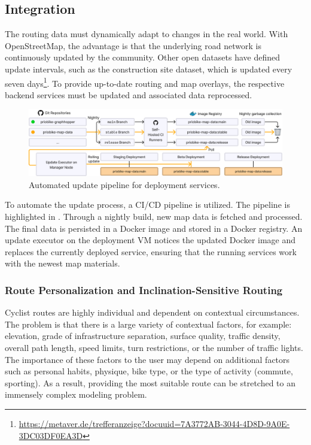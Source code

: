 \subsection{Integration}

The routing data must dynamically adapt to changes in the real world. With OpenStreetMap, the advantage is that the underlying road network is continuously updated by the community. Other open datasets have defined update intervals, such as the construction site dataset, which is updated every seven days\footnote{\url{https://metaver.de/trefferanzeige?docuuid=7A3772AB-3044-4D8D-9A0E-3DC03DF0EA3D}}. To provide up-to-date routing and map overlays, the respective backend services must be updated and associated data reprocessed. 

\begin{figure}[htbp]
\centering
\includegraphics[width=\linewidth]{images/multi-stage-continuous-deployment.png}
\caption{Automated update pipeline for deployment services.}
\label{fig:multi-stage-continuous-deployment}
\end{figure}

To automate the update process, a CI/CD pipeline is utilized. The pipeline is highlighted in . Through a nightly build, new map data is fetched and processed. The final data is persisted in a Docker image and stored in a Docker registry. An update executor on the deployment VM notices the updated Docker image and replaces the currently deployed service, ensuring that the running services work with the newest map materials.

\subsubsection{Route Personalization and Inclination-Sensitive Routing}

Cyclist routes are highly individual and dependent on contextual circumstances. The problem is that there is a large variety of contextual factors, for example: elevation, grade of infrastructure separation, surface quality, traffic density, overall path length, speed limits, turn restrictions, or the number of traffic lights. The importance of these factors to the user may depend on additional factors such as personal habits, physique, bike type, or the type of activity (commute, sporting). As a result, providing the most suitable route can be stretched to an immensely complex modeling problem.


